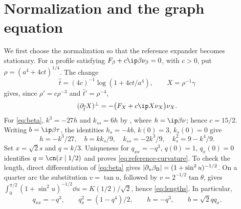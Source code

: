 \section{Normalization and the graph equation}\label{sec:geometry}
We first choose the normalization so that the reference expander becomes stationary. For a profile satisfying $F_\beta+c\ip\beta{\nu_\beta}=0$, with $c>0$, put $\rho=(a^4+4ct)^{1/4}$. The change
\begin{equation}\label{eq:normalization}
 \widehat t=(4c)^{-1}\log(1+4ct/a^4),\qquad X=\rho^{-1}\gamma
\end{equation}
gives, since $\rho'=c\rho^{-3}$ and $\widehat t'=\rho^{-4}$,
\begin{equation}\label{eq:normalized-flow}
 (\partial_{\widehat t} X)^\perp=-\big(F_X+c\ip X{\nu_X}\big)\nu_X.
\end{equation}
For \eqref{eq:beta}, $k^3=-27h$ and $k_{ss}=6h$ by \cite[Section~2.2.3]{MW}, where $h=\ip\beta\nu$; hence $c=15/2$. Writing $b=\ip\beta\tau$, the identities $h_s=-kb$, $k(0)=3$, $k_s(0)=0$ give
\begin{equation}\label{eq:bernoulli-identities}
 h=-k^3/27,\quad b=kk_s/9,\quad
 k_{ss}=-2k^3/9,\quad k_s^2=9-k^4/9.
\end{equation}
Set $x=\sqrt2s$ and $q=k/3$. Uniqueness for $q_{xx}=-q^3$, $q(0)=1$, $q_x(0)=0$ identifies $q=\cn(x\mid1/2)$ and proves \eqref{eq:reference-curvature}. To check the length, direct differentiation of \eqref{eq:beta} gives $|\partial_u\beta_{\rm B}|=(1+\sin^2u)^{-1/2}$. On a quarter arc the substitution $v=\tan u$, followed by $v=2^{-1/2}\tan\theta$, gives $\int_0^{\pi/2}(1+\sin^2u)^{-1/2}\dd u=K(1/2)/\sqrt2$, hence \eqref{eq:lengths}. In particular,
\begin{equation}\label{eq:q-identities}
 q_{xx}=-q^3,\qquad q_x^2=(1-q^4)/2,\qquad
 h=-q^3,\qquad b=\sqrt2qq_x.
\end{equation}

